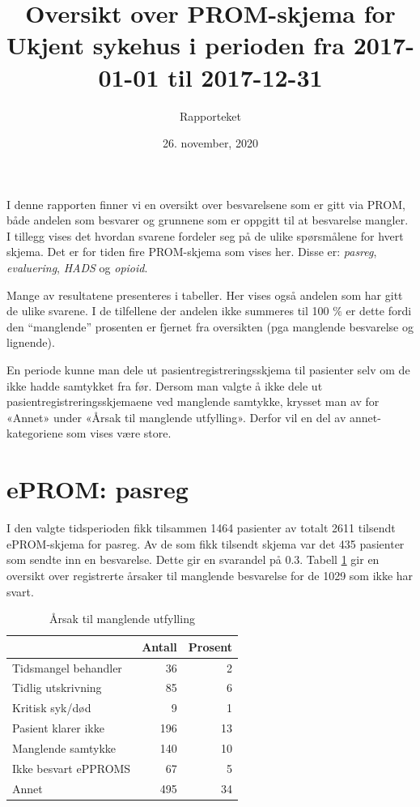 \documentclass[
]{article}
\title{Oversikt over PROM-skjema for Ukjent sykehus i perioden fra 2017-01-01
til 2017-12-31}
\author{Rapporteket}
\date{26. november, 2020}
\begin{document}
\maketitle

I denne rapporten finner vi en oversikt over besvarelsene som er gitt
via PROM, både andelen som besvarer og grunnene som er oppgitt til at
besvarelse mangler. I tillegg vises det hvordan svarene fordeler seg på
de ulike spørsmålene for hvert skjema. Det er for tiden fire PROM-skjema
som vises her. Disse er: \emph{pasreg}, \emph{evaluering}, \emph{HADS}
og \emph{opioid}.

Mange av resultatene presenteres i tabeller. Her vises også andelen som
har gitt de ulike svarene. I de tilfellene der andelen ikke summeres til
100 \(\%\) er dette fordi den ``manglende'' prosenten er fjernet fra
oversikten (pga manglende besvarelse og lignende).

En periode kunne man dele ut pasientregistreringsskjema til pasienter
selv om de ikke hadde samtykket fra før. Dersom man valgte å ikke dele
ut pasientregistreringsskjemaene ved manglende samtykke, krysset man av
for «Annet» under «Årsak til manglende utfylling». Derfor vil en del av
annet-kategoriene som vises være store.

\hypertarget{eprom-pasreg}{%
\section{ePROM: pasreg}\label{eprom-pasreg}}

I den valgte tidsperioden fikk tilsammen 1464 pasienter av totalt 2611
tilsendt ePROM-skjema for pasreg. Av de som fikk tilsendt skjema var det
435 pasienter som sendte inn en besvarelse. Dette gir en svarandel på
0.3. Tabell \ref{tab:tabPR} gir en oversikt over registrerte årsaker til
manglende besvarelse for de 1029 som ikke har svart.

\begin{table}

\caption{\label{tab:pasreg}Årsak til manglende utfylling\label{tab:tabPR}}
\centering
\begin{tabular}[t]{l|r|r}
\hline
 & Antall  & Prosent\\
\hline
Tidsmangel behandler & 36 & 2\\
\hline
Tidlig utskrivning & 85 & 6\\
\hline
Kritisk syk/død & 9 & 1\\
\hline
Pasient klarer ikke & 196 & 13\\
\hline
Manglende samtykke & 140 & 10\\
\hline
Ikke besvart ePPROMS & 67 & 5\\
\hline
Annet & 495 & 34\\
\hline
\end{tabular}
\end{table}
\end{document}
